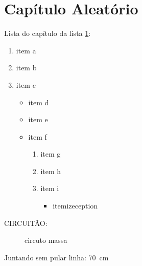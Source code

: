 \chapter{Capítulo Aleatório}
\label{chap:CapAle}

Lista do capítulo da lista \ref{chap:CapAle}:

\begin{enumerate}
\item item a
\item item b
\item item c
	\begin{itemize}
	\item item d
	\item item e
	\item item f
		\begin{enumerate}[label*=\arabic*.]
		\item item g
		\item item h
		\item item i
			\begin{itemize}
			\item itemizeception
			\end{itemize}
		\end{enumerate}
	\end{itemize}
\end{enumerate}

CIRCUITÃO:

\begin{figure}[!htb] \label{fig:circuitevers}
\centering
{}
\caption{circuto massa}
\end{figure}

Juntando sem pular linha: 70~cm